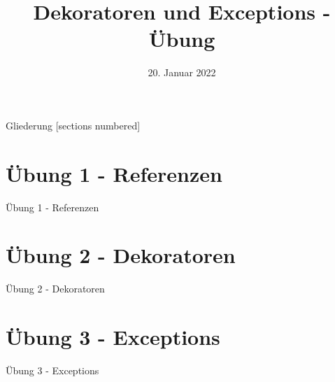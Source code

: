 



\title{Dekoratoren und Exceptions - Übung}
\date{20. Januar 2022}


\maketitle

\begin{frame}{Gliederung}
	[sections numbered]
	\tableofcontents
\end{frame}


\section{Übung 1 - Referenzen}
\begin{frame}{Übung 1 - Referenzen}
	
\end{frame}


\section{Übung 2 - Dekoratoren}
\begin{frame}{Übung 2 - Dekoratoren}
	
\end{frame}


\section{Übung 3 - Exceptions}
\begin{frame}{Übung 3 - Exceptions}
	
\end{frame}



